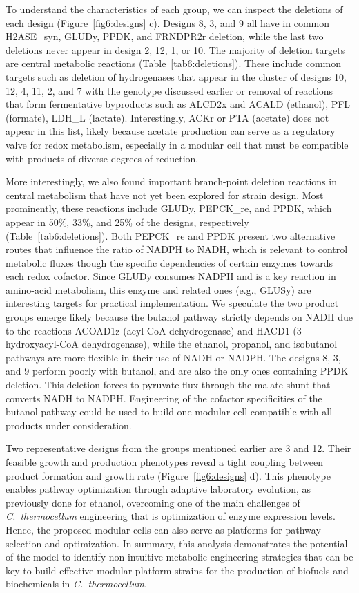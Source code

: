 To understand the characteristics of each group, we can inspect the deletions of each design (Figure~\ref{fig6:designs} c).
Designs 8, 3, and 9 all have in common H2ASE\_syn, GLUDy, PPDK, and FRNDPR2r deletion, while the last two deletions never appear in design 2, 12, 1, or 10.
The majority of deletion targets are central metabolic reactions (Table~\ref{tab6:deletions}).
These include common targets such as deletion of hydrogenases that appear in the cluster of designs 10, 12, 4, 11, 2, and 7 with the  genotype discussed earlier or removal of reactions that form fermentative byproducts such as ALCD2x and ACALD (ethanol), PFL (formate), LDH\_L (lactate).
Interestingly, ACKr or PTA (acetate) does not appear in this list, likely because acetate production can serve as a regulatory valve for redox metabolism, especially in a modular cell that must be compatible with products of diverse degrees of reduction.

More interestingly, we also found important branch-point deletion reactions\citep{stephanopoulos1991} in central metabolism that have not yet been explored for strain design.
Most prominently, these reactions include GLUDy, PEPCK\_re, and PPDK, which appear in 50\%, 33\%, and 25\% of the designs, respectively
(Table~\ref{tab6:deletions}).
Both PEPCK\_re and PPDK present two alternative routes that influence the ratio of NADPH to NADH, which is relevant to control metabolic fluxes though the specific dependencies of certain enzymes towards each redox cofactor.
Since GLUDy consumes NADPH and is a key reaction in amino-acid metabolism, this enzyme and related ones (e.g., GLUSy) are interesting targets for practical implementation.
We speculate the two product groups emerge likely because the butanol pathway strictly depends on NADH due to the reactions ACOAD1z (acyl-CoA dehydrogenase) and HACD1 (3-hydroxyacyl-CoA dehydrogenase), while the ethanol, propanol, and isobutanol pathways are more flexible in their use of NADH or NADPH. The designs 8, 3, and 9 perform poorly with butanol, and are also the only ones containing PPDK deletion. This deletion forces  to pyruvate flux through the malate shunt that converts NADH to NADPH. Engineering of the cofactor specificities of the butanol pathway could be used to build one modular cell compatible with all products under consideration.


Two representative designs from the groups mentioned earlier are 3 and 12.
Their feasible growth and production phenotypes reveal a tight coupling between product formation and growth rate (Figure~\ref{fig6:designs} d).
This phenotype enables pathway optimization through adaptive laboratory evolution, as previously done for ethanol,\citep{tian2016} overcoming one of the main challenges of \textit{C.~thermocellum} engineering that is optimization of enzyme expression levels. Hence, the proposed modular cells can also serve as platforms for pathway selection and optimization.
In summary, this analysis demonstrates the potential of the model to identify non-intuitive metabolic engineering strategies that can be key to build effective modular platform strains for the production of biofuels and biochemicals in \textit{C.~thermocellum}.

